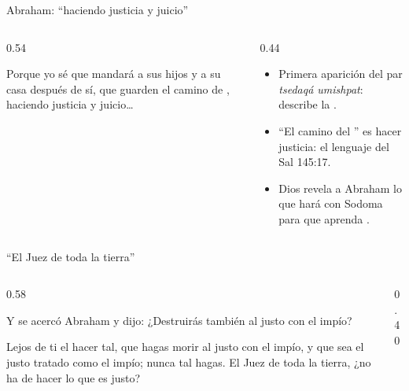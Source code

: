 \begin{frame}{Abraham: ``haciendo justicia y juicio''}
\begin{columns}[c,onlytextwidth]
\begin{column}{0.54\textwidth}
\begin{cita}Porque yo sé que mandará a sus hijos y a su casa después de sí, que guarden el camino de \SENOR, haciendo justicia y juicio\ldots{}\end{cita}
\begin{center}\small{}\end{center}
\end{column}
\begin{column}{0.44\textwidth}\small
\begin{itemize}
\item Primera aparición del par \emph{tsedaqá umishpat}: describe la .
\item ``El camino del \SENOR'' es hacer justicia: el lenguaje del Sal 145:17.
\item Dios revela a Abraham lo que hará con Sodoma para que aprenda .
\end{itemize}
\end{column}
\end{columns}
\end{frame}

\begin{frame}{``El Juez de toda la tierra''}
\begin{columns}[c,onlytextwidth]
\begin{column}{0.58\textwidth}
\begin{cita}Y se acercó Abraham y dijo: ¿Destruirás también al justo con el impío?\end{cita}
\begin{cita}Lejos de ti el hacer tal, que hagas morir al justo con el impío, y que sea el justo tratado como el impío; nunca tal hagas. El Juez de toda la tierra, ¿no ha de hacer lo que es justo?\end{cita}
\end{column}
\begin{column}{0.40\textwidth}\end{column}
\end{columns}
\end{frame}

